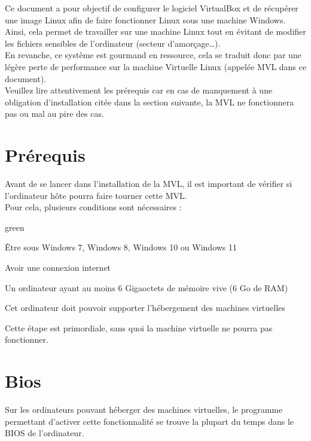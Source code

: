 {Ce document a pour objectif de configurer le logiciel VirtualBox et de récupérer une image Linux 
afin de faire fonctionner Linux sous une machine Windows.\\
Ainsi, cela permet de travailler sur une machine Linux tout en évitant de modifier les fichiers 
sensibles de l’ordinateur (secteur d’amorçage…).\\
En revanche, ce système est gourmand en ressource, cela se traduit donc par une légère perte de 
performance sur la machine Virtuelle Linux (appelée MVL dans ce document).\\

Veuillez lire attentivement les prérequis car en cas de manquement à une obligation d’installation 
citée dans la section suivante, la MVL ne fonctionnera pas ou mal au pire des cas.\\



\section{Prérequis}


Avant de se lancer dans l’installation de la MVL, il est important de vérifier si l’ordinateur 
hôte pourra faire tourner cette MVL.\\
Pour cela, plusieurs conditions sont nécessaires :

\begin{items}{green}{\faviconCheck}
\item Être sous Windows 7, Windows 8, Windows 10 ou Windows 11
\item Avoir une connexion internet
\item Un ordinateur ayant au moins 6 Gigaoctets de mémoire vive (6 Go de RAM)
\item Cet ordinateur doit pouvoir supporter l’hébergement des machines virtuelles
\end{items}

Cette étape est primordiale, sans quoi la machine virtuelle ne pourra pas fonctionner.



\section{Bios}

Sur les ordinateurs pouvant héberger des machines virtuelles, le programme permettant 
d’activer cette fonctionnalité se trouve la plupart du temps dans le BIOS de l’ordinateur.\\

}
